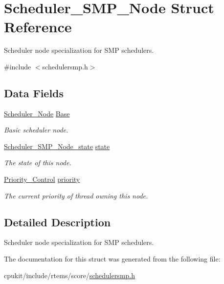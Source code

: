 \hypertarget{structScheduler__SMP__Node}{}\section{Scheduler\+\_\+\+S\+M\+P\+\_\+\+Node Struct Reference}
\label{structScheduler__SMP__Node}


Scheduler node specialization for S\+MP schedulers.  




{\ttfamily \#include $<$schedulersmp.\+h$>$}

\subsection*{Data Fields}
\begin{DoxyCompactItemize}
\item 
\mbox{\label{structScheduler__SMP__Node_a6f5ebcbb0ec059abc7d97fe582ddb63a}} 
\mbox{\hyperlink{structScheduler__Node}{Scheduler\+\_\+\+Node}} \mbox{\hyperlink{structScheduler__SMP__Node_a6f5ebcbb0ec059abc7d97fe582ddb63a}{Base}}
\begin{DoxyCompactList}\small\item\em Basic scheduler node. \end{DoxyCompactList}\item 
\mbox{\label{structScheduler__SMP__Node_a11615074b229964c2a02436efd1caad7}} 
\mbox{\hyperlink{group__RTEMSScoreSchedulerSMP_gae8abff79029e8e3da109701348c4eccd}{Scheduler\+\_\+\+S\+M\+P\+\_\+\+Node\+\_\+state}} \mbox{\hyperlink{structScheduler__SMP__Node_a11615074b229964c2a02436efd1caad7}{state}}
\begin{DoxyCompactList}\small\item\em The state of this node. \end{DoxyCompactList}\item 
\mbox{\label{structScheduler__SMP__Node_a385ae5889c0a02feccb81293bc2ab236}} 
\mbox{\hyperlink{group__RTEMSScorePriority_ga59d02b58072d31a9a1cfe644557aefe2}{Priority\+\_\+\+Control}} \mbox{\hyperlink{structScheduler__SMP__Node_a385ae5889c0a02feccb81293bc2ab236}{priority}}
\begin{DoxyCompactList}\small\item\em The current priority of thread owning this node. \end{DoxyCompactList}\end{DoxyCompactItemize}


\subsection{Detailed Description}
Scheduler node specialization for S\+MP schedulers. 

The documentation for this struct was generated from the following file\+:\begin{DoxyCompactItemize}
\item 
cpukit/include/rtems/score/\mbox{\hyperlink{schedulersmp_8h}{schedulersmp.\+h}}\end{DoxyCompactItemize}
